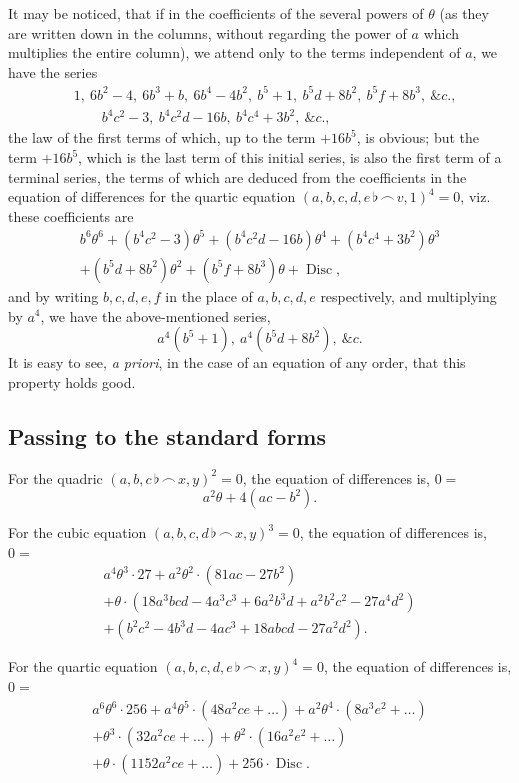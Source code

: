 \documentclass[11pt,a4paper]{article}
\theoremstyle{definition}
\DeclareMathOperator{\Disc}{Disc}
\begin{document}
It may be noticed, that if in the coefficients of the several powers of $\theta$ (as they are written down in the columns, without regarding the power of $a$ which multiplies the entire column), we attend only to the terms independent of $a$, we have the series
\begin{align*}
&1,\ 6b^2-4,\ 6b^3+b,\ 6b^4-4b^2,\ b^5+1,\ b^5d+8b^2,\ b^5f+8b^3,\ \&c.,\\
&\qquad b^4c^2-3,\ b^4c^2d-16b,\ b^4c^4+3b^2,\ \&c.,
\end{align*}
the law of the first terms of which, up to the term $+16b^5$, is obvious; but the term $+16b^5$, which is the last term of this initial series, is also the first term of a terminal series, the terms of which are deduced from the coefficients in the equation of differences for the quartic equation $(a,b,c,d,e\,\flat\,\frown\, v,1)^4=0$, viz. these coefficients are
\begin{multline*}
b^6\theta^6+(b^4c^2-3)\theta^5+(b^4c^2d-16b)\theta^4+(b^4c^4+3b^2)\theta^3\\
+(b^5d+8b^2)\theta^2+(b^5f+8b^3)\theta+\Disc,
\end{multline*}
and by writing $b,c,d,e,f$ in the place of $a,b,c,d,e$ respectively, and multiplying by $a^4$, we have the above-mentioned series,
\[
a^4(b^5+1),\ a^4(b^5d+8b^2),\ \&c.
\]
It is easy to see, \textit{a priori}, in the case of an equation of any order, that this property holds good.

\subsection*{Passing to the standard forms}

For the quadric $(a,b,c\,\flat\,\frown\, x,y)^2=0$, the equation of differences is, $0=$
\[
a^2\theta+4(ac-b^2).
\]

For the cubic equation $(a,b,c,d\,\flat\,\frown\, x,y)^3=0$, the equation of differences is, $0=$
\begin{multline*}
a^4\theta^3\cdot27+a^2\theta^2\cdot(81ac-27b^2)\\
+\theta\cdot(18a^3bcd-4a^3c^3+6a^2b^3d+a^2b^2c^2-27a^4d^2)\\
+(b^2c^2-4b^3d-4ac^3+18abcd-27a^2d^2).
\end{multline*}

For the quartic equation $(a,b,c,d,e\,\flat\,\frown\, x,y)^4=0$, the equation of differences is, $0=$
\begin{multline*}
a^6\theta^6\cdot256+a^4\theta^5\cdot(48a^2ce+\ldots)+a^2\theta^4\cdot(8a^3e^2+\ldots)\\
+\theta^3\cdot(32a^2ce+\ldots)+\theta^2\cdot(16a^2e^2+\ldots)\\
+\theta\cdot(1152a^2ce+\ldots)+256\cdot\Disc.
\end{multline*}
\end{document}
